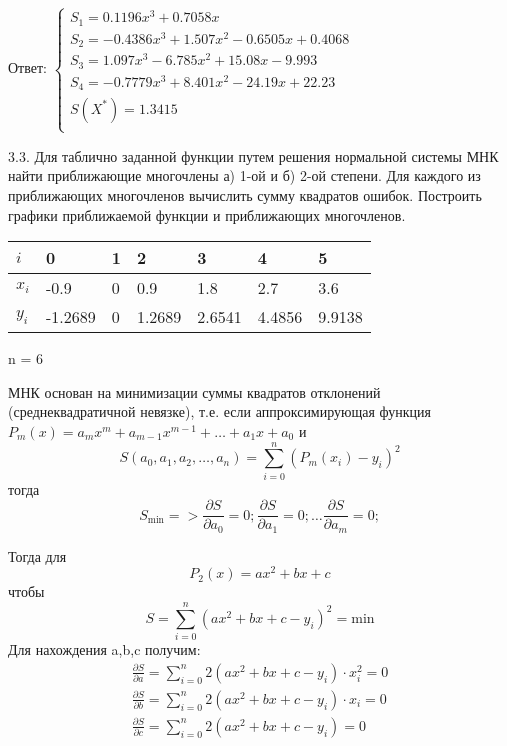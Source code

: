 \documentclass[10pt, a4paper]{scrartcl}
\begin{document}
Ответ:
\(\displaystyle \begin{cases} S_1 = 0.1196 x^3+0.7058 x\\ S_2 = -0.4386 x^3+1.507 x^2-0.6505 x+0.4068\\ S_3 = 1.097 x^3-6.785 x^2+15.08 x-9.993\\ S_4 = -0.7779 x^3+8.401 x^2-24.19 x+22.23\\ S(X^{*}) = 1.3415\\ \end{cases}\)

\pagebreak

3.3. Для таблично заданной функции путем решения нормальной системы МНК
найти приближающие многочлены а) 1-ой и б) 2-ой степени. Для каждого из
приближающих многочленов вычислить сумму квадратов ошибок. Построить
графики приближаемой функции и приближающих многочленов.

\vspace{5mm}\begin{center}
\begin{tabular}{ | l  | l  | l  | l  | l  | l  | l |}
\hline
$i$ & 0 & 1 & 2 & 3 & 4 & 5 \\ \hline
$x_i$ & -0.9 & 0 & 0.9 & 1.8 & 2.7 & 3.6 \\ \hline
$y_i$ & -1.2689 & 0 & 1.2689 & 2.6541 & 4.4856 & 9.9138 \\ \hline
\end{tabular}
\end{center}

n = 6

\vspace{5mm}

МНК основан на минимизации суммы квадратов отклонений
(среднеквадратичной невязке), т.е. если аппроксимирующая функция
\(P_m(x) = a_m x^m + a_{m-1}x^{m-1} + \dots + a_1x + a_0\) и
\[S(a_0, a_1, a_2, \dots , a_n) = \sum_{i=0}^n(P_m(x_i)-y_i)^2\] тогда
\[S_{\text{min}} => \frac{\partial S}{\partial a_0} = 0; \frac{\partial S}{\partial a_1} = 0; \dots \frac{\partial S}{\partial a_m} = 0;\]

Тогда для \[P_2(x) = ax^2 + bx + c\] чтобы
\[S=\sum_{i=0}^n(ax^2 + bx + c - y_i)^2 = \mathrm{min}\] Для нахождения
a,b,c получим: \[\begin{array}{l} 
\frac{\partial S}{\partial a} = \displaystyle\sum_{i=0}^n 2(ax^2 + bx + c - y_i)\cdot x_i^2 = 0\\
\frac{\partial S}{\partial b} = \displaystyle\sum_{i=0}^n 2(ax^2 + bx + c - y_i)\cdot x_i = 0\\
\frac{\partial S}{\partial c} = \displaystyle\sum_{i=0}^n 2(ax^2 + bx + c - y_i) = 0\\
\end{array}\]
\end{document}
